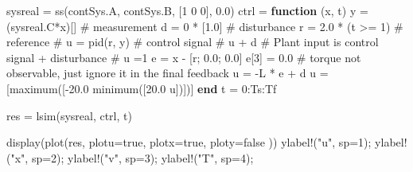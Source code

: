 \documentclass[
  8pt,
  a4paper,
]{book}
\newenvironment{Shaded}{\begin{snugshade}}{\end{snugshade}}
\newcommand{\CommentTok}[1]{\textcolor[rgb]{0.37,0.37,0.37}{#1}}
\newcommand{\ConstantTok}[1]{\textcolor[rgb]{0.56,0.35,0.01}{#1}}
\newcommand{\FloatTok}[1]{\textcolor[rgb]{0.68,0.00,0.00}{#1}}
\newcommand{\FunctionTok}[1]{\textcolor[rgb]{0.28,0.35,0.67}{#1}}
\newcommand{\KeywordTok}[1]{\textcolor[rgb]{0.00,0.23,0.31}{\textbf{#1}}}
\newcommand{\NormalTok}[1]{\textcolor[rgb]{0.00,0.23,0.31}{#1}}
\newcommand{\OperatorTok}[1]{\textcolor[rgb]{0.37,0.37,0.37}{#1}}
\newcommand{\StringTok}[1]{\textcolor[rgb]{0.13,0.47,0.30}{#1}}
\begin{document}
\begin{Shaded}
\begin{Highlighting}[]
\NormalTok{sysreal }\OperatorTok{=} \FunctionTok{ss}\NormalTok{(contSys.A, contSys.B, [}\FloatTok{1} \FloatTok{0} \FloatTok{0}\NormalTok{], }\FloatTok{0.0}\NormalTok{)}
\NormalTok{ctrl }\OperatorTok{=} \KeywordTok{function}\NormalTok{ (x, t)}
\NormalTok{    y }\OperatorTok{=}\NormalTok{ (sysreal.C}\OperatorTok{*}\NormalTok{x)[] }\CommentTok{\# measurement}
\NormalTok{    d }\OperatorTok{=} \FloatTok{0} \OperatorTok{*}\NormalTok{ [}\FloatTok{1.0}\NormalTok{]        }\CommentTok{\# disturbance}
\NormalTok{    r }\OperatorTok{=} \FloatTok{2.0} \OperatorTok{*}\NormalTok{ (t }\OperatorTok{\textgreater{}=} \FloatTok{1}\NormalTok{) }\CommentTok{\# reference}
    \CommentTok{\# u = pid(r, y) \# control signal}
    \CommentTok{\# u + d \# Plant input is control signal + disturbance}
    \CommentTok{\# u =1}
    \ConstantTok{e} \OperatorTok{=}\NormalTok{ x }\OperatorTok{{-}}\NormalTok{ [r; }\FloatTok{0.0}\NormalTok{; }\FloatTok{0.0}\NormalTok{]}
    \ConstantTok{e}\NormalTok{[}\FloatTok{3}\NormalTok{] }\OperatorTok{=} \FloatTok{0.0} \CommentTok{\# torque not observable, just ignore it in the final feedback}
\NormalTok{    u }\OperatorTok{=} \OperatorTok{{-}}\NormalTok{L }\OperatorTok{*} \ConstantTok{e} \OperatorTok{+}\NormalTok{ d}
\NormalTok{    u }\OperatorTok{=}\NormalTok{ [}\FunctionTok{maximum}\NormalTok{([}\OperatorTok{{-}}\FloatTok{20.0} \FunctionTok{minimum}\NormalTok{([}\FloatTok{20.0}\NormalTok{ u])])]}
\KeywordTok{end}
\NormalTok{t }\OperatorTok{=} \FloatTok{0}\OperatorTok{:}\NormalTok{Ts}\OperatorTok{:}\NormalTok{Tf}

\NormalTok{res }\OperatorTok{=} \FunctionTok{lsim}\NormalTok{(sysreal, ctrl, t)}

\FunctionTok{display}\NormalTok{(}\FunctionTok{plot}\NormalTok{(res, }
\NormalTok{    plotu}\OperatorTok{=}\ConstantTok{true}\NormalTok{, }
\NormalTok{    plotx}\OperatorTok{=}\ConstantTok{true}\NormalTok{, }
\NormalTok{    ploty}\OperatorTok{=}\ConstantTok{false}
\NormalTok{    ))}
\FunctionTok{ylabel!}\NormalTok{(}\StringTok{"u"}\NormalTok{, sp}\OperatorTok{=}\FloatTok{1}\NormalTok{);}
\FunctionTok{ylabel!}\NormalTok{(}\StringTok{"x"}\NormalTok{, sp}\OperatorTok{=}\FloatTok{2}\NormalTok{);}
\FunctionTok{ylabel!}\NormalTok{(}\StringTok{"v"}\NormalTok{, sp}\OperatorTok{=}\FloatTok{3}\NormalTok{);}
\FunctionTok{ylabel!}\NormalTok{(}\StringTok{"T"}\NormalTok{, sp}\OperatorTok{=}\FloatTok{4}\NormalTok{);}
\end{Highlighting}
\end{Shaded}
\end{document}
